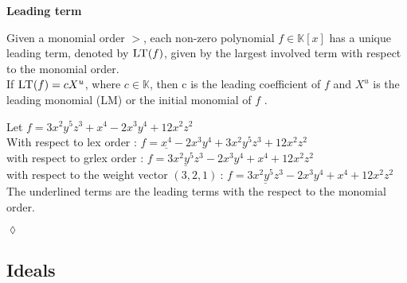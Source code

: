 \textbf{Leading term}

Given a monomial order $>$, each non-zero polynomial $f \in \mathbb{K}\left[ x\right] $ has a unique leading term, denoted by $\textsc{LT}(f)$, given by the largest involved term with respect to the monomial order.\\
If $\textsc{LT}(f) = cX^{u}$, where $c \in \mathbb{K}$, then c is the leading coefficient of $f$ and $X^{u}$ is the leading monomial (\textsc{LM}) or the initial monomial of $f$ \cite{KHZ}.\\

\begin{env_example}\normalfont

Let $ f = 3x^{2}y^{5}z^{3} + x^{4} -2x^{3}y^{4} + 12x^{2}z^{2}$ \\
With respect to lex order : $f = \underline{x^{4}} -2x^{3}y^{4} + 3x^{2}y^{5}z^{3} + 12x^{2}z^{2} $ \\
with respect to grlex order : $f = \underline{3x^{2}y^{5}z^{3}} -2x^{3}y^{4} + x^{4}+ 12x^{2}z^{2}$  \\
with respect to the weight vector $\left(3,2,1\right)~$: $f = \underline{3x^{2}y^{5}z^{3}} -2x^{3}y^{4} + x^{4}+ 12x^{2}z^{2}$  \\ 
The underlined terms are the leading terms with the respect to the monomial order.
\begin{flushright}
$\lozenge$
\end{flushright} 
\end{env_example}


\newpage
\subsection{Ideals}
\label{subsec:Ideals}

